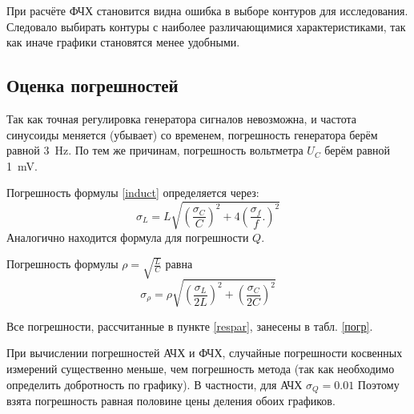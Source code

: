 \documentclass[a4paper]{article}
\begin{document}
При расчёте ФЧХ становится видна ошибка в выборе контуров для исследования. Следовало выбирать контуры с наиболее различающимися характеристиками, так как иначе графики становятся менее удобными.

\subsection{Оценка погрешностей}
Так как точная регулировка генератора сигналов невозможна, и частота синусоиды меняется (убывает) со временем, погрешность генератора берём равной \SI{3}{\hertz}. По тем же причинам, погрешность вольтметра $ U_C $ берём равной \SI{1}{\milli \volt}.

Погрешность формулы \eqref{induct} определяется через:
\begin{equation}\label{sig_induct}
\sigma_L = L\sqrt{\left( \frac{\sigma_C}{C}\right)^2	+ 4\left( \frac{\sigma_f}{f}.
\right)^2}\end{equation}
Аналогично находится формула для погрешности $ Q $.

Погрешность формулы $ \rho = \sqrt{\frac{L}{C}} $ равна
\begin{equation}\label{sig_rho}
	\sigma_\rho = \rho \sqrt{\left( \frac{\sigma_L}{2L}\right)^2+\left( \frac{\sigma_C}{2C}\right)^2}
\end{equation}

Все погрешности, рассчитанные в пункте \ref{respar}, занесены в табл. \ref{погр}.

При вычислении погрешностей АЧХ и ФЧХ, случайные погрешности косвенных измерений существенно меньше, чем погрешность метода (так как необходимо определить добротность по графику). В частности, для АЧХ $ \sigma_Q = 0.01 $ Поэтому взята погрешность равная половине цены деления обоих графиков.
\end{document}
